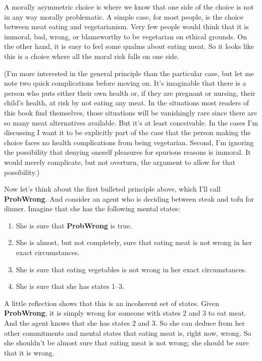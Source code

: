 A morally asymmetric choice is where we know that one side of the choice is not in any way morally problematic. A simple case, for most people, is the choice between meat eating and vegetarianism. Very few people would think that it is immoral, bad, wrong, or blameworthy to be vegetarian on ethical grounds. On the other hand, it is easy to feel some qualms about eating meat. So it looks like this is a choice where all the moral risk falls on one side.

(I'm more interested in the general principle than the particular case, but let me note two quick complications before moving on. It's imaginable that there is a person who puts either their own health or, if they are pregnant or nursing, their child's health, at risk by not eating any meat. In the situations most readers of this book find themselves, those situations will be vanishingly rare since there are so many meat alternatives available. But it's at least conceivable. In the cases I'm discussing I want it to be explicitly part of the case that the person making the choice faces no health complications from being vegetarian. Second, I'm ignoring the possibility that denying oneself pleasures for spurious reasons is immoral. It would merely complicate, but not overturn, the argument to allow for that possibility.)

Now let's think about the first bulleted principle above, which I'll call \textbf{ProbWrong}. And consider an agent who is deciding between steak and tofu for dinner. Imagine that she has the following mental states:

\begin{enumerate}
\item{} She is sure that \textbf{ProbWrong} is true.

\item{} She is almost, but not completely, sure that eating meat is not wrong in her exact circumstances.

\item{} She is sure that eating vegetables is not wrong in her exact circumstances.

\item{} She is sure that she has states 1--3.

\end{enumerate}
A little reflection shows that this is an incoherent set of states. Given \textbf{ProbWrong}, it is simply wrong for someone with states 2 and 3 to eat meat. And the agent knows that she has states 2 and 3. So she can deduce from her other commitments and mental states that eating meat is, right now, wrong. So she shouldn't be almost sure that eating meat is not wrong; she should be sure that it is wrong.


